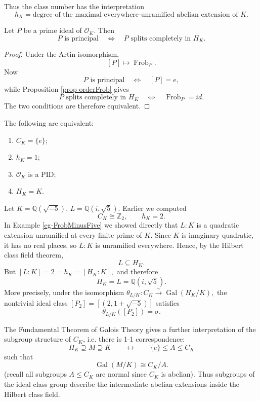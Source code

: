 Thus the class number has the interpretation
\[
\boxed{
h_K=\text{degree of the maximal everywhere-unramified abelian extension of }K.}
\]

\begin{corollary}\label{cor-principalSplit}
Let $P$ be a prime ideal of $\mathcal O_K$. Then
\[
\boxed{
P\text{ is principal}
\quad\Longleftrightarrow\quad
P\text{ splits completely in }H_K.}
\]
\end{corollary}

\begin{proof}
Under the Artin isomorphism,
\[
[P]\longmapsto\operatorname{Frob}_P.
\]
Now
\[
P\text{ is principal}
\quad\Longleftrightarrow\quad
[P]=e,
\]
while Proposition \ref{prop-orderFrob} gives
\[
P\text{ splits completely in }H_K
\quad\Longleftrightarrow\quad
\operatorname{Frob}_P=id.
\]
The two conditions are therefore equivalent.
\end{proof}

\begin{corollary}
The following are equivalent:
\begin{enumerate}
    \item $C_K=\{e\}$;
    \item $h_K=1$;
    \item $\mathcal O_K$ is a PID;
    \item $H_K=K$.
\end{enumerate}
\end{corollary}

\begin{example}\label{eg-HilbertMinusFive}
Let
\(K=\mathbb Q(\sqrt{-5})\),
\(L=\mathbb Q(i,\sqrt5).
\) Earlier we computed
\[
C_K\cong\mathbb Z_2,
\qquad
h_K=2.
\]
In Example \ref{eg-FrobMinusFive} we showed directly that $L:K$ is a quadratic extension
unramified at every finite prime of $K$. Since $K$ is imaginary quadratic, it has no
real places, so $L:K$ is unramified everywhere. Hence, by the Hilbert class field theorem,
\[
L\subseteq H_K.
\]
But \([L:K]=2=h_K=[H_K:K],
\) and therefore
\[
\boxed{H_K=L=\mathbb Q(i,\sqrt5).}
\]
More precisely, under the isomorphism $\theta_{L/K}: C_K
\stackrel{\sim}{\longrightarrow}
\operatorname{Gal}(H_K/K),$ the nontrivial ideal class
\([P_2]=[(2,1+\sqrt{-5})]
\)
satisfies
$$\theta_{L/K}([P_2]) = \sigma.$$
\end{example}


The Fundamental Theorem of Galois Theory gives a further interpretation of the subgroup
structure of $C_K$, i.e. there is 1-1 correspondence:
\[
H_K\supseteq M \supseteq K \qquad \longleftrightarrow \qquad \{e\} \leq A \leq C_K
\]
such that
\[
\operatorname{Gal}(M/K)\cong C_K/A.
\]
(recall all subgroups $A \leq C_K$ are normal since $C_K$ is abelian). Thus subgroups of the ideal class group describe the intermediate abelian extensions inside
the Hilbert class field.

